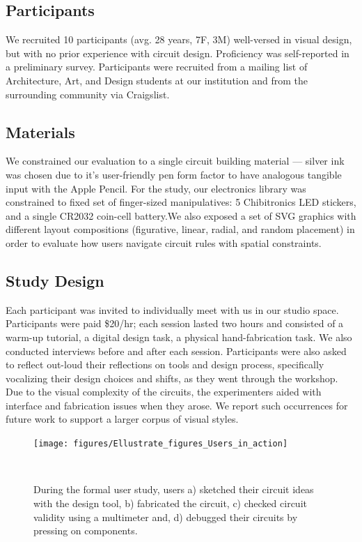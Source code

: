 \documentclass{sigchi}
\begin{document}
\subsection{Participants}
    We recruited 10 participants (avg. 28 years, 7F, 3M) well-versed in visual design, but with no prior experience with circuit design. Proficiency was self-reported in a preliminary survey. Participants were recruited from a mailing list of Architecture, Art, and Design students at our institution and from the surrounding community via Craigslist.

\subsection{Materials}
    We constrained our evaluation to a single circuit building material --- silver ink was chosen due to it's user-friendly pen form factor to have analogous tangible input with the Apple Pencil. For the study, our electronics library was constrained to fixed set of finger-sized manipulatives: 5 Chibitronics LED stickers, and a single CR2032 coin-cell battery.We also exposed a set of SVG graphics with different layout compositions (figurative, linear, radial, and random placement) in order to evaluate how users navigate circuit rules with spatial constraints. 

\subsection{Study Design}

    Each participant was invited to individually meet with us in our studio space. Participants were paid \$20/hr; each session lasted two hours and consisted of a warm-up tutorial, a digital design task, a physical hand-fabrication task. We also conducted interviews before and after each session. Participants were also asked to reflect out-loud their reflections on tools and design process, specifically vocalizing their design choices and shifts, as they went through the workshop. Due to the visual complexity of the circuits, the experimenters aided with interface and fabrication issues when they arose. We report such occurrences for future work to support a larger corpus of visual styles.
    
    \begin{figure}[h]
    \centering
      \texttt{[image: figures/Ellustrate\_figures\_Users\_in\_action]}
      \caption{During the formal user study, users a) sketched their circuit ideas with the design tool, b) fabricated the circuit, c) checked circuit validity using a multimeter and, d) debugged their circuits by pressing on components.}~\label{fig:users-in-action}
      \vspace{-20pt}
    \end{figure}
\end{document}
